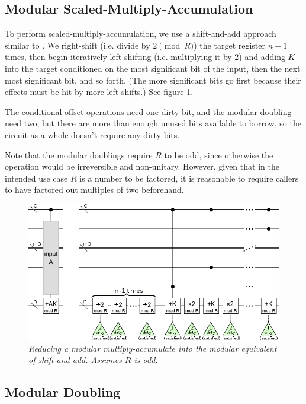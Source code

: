 \documentclass[twocolumn]{article}
\begin{document}
\subsection{Modular Scaled-Multiply-Accumulation}

To perform scaled-multiply-accumulation, we use a shift-and-add approach similar to \cite{beauregard2003}.
We right-shift (i.e. divide by $2 {\pmod R}$) the target register $n-1$ times, then begin iteratively left-shifting (i.e. multiplying it by 2) and adding $K$ into the target conditioned on the most significant bit of the input, then the next most significant bit, and so forth.
(The more significant bits go first because their effects must be hit by more left-shifts.)
See figure \ref{fig:controlled-modular-multiply-accumulate}.

The conditional offset operations need one dirty bit, and the modular doubling need two, but there are more than enough unused bits available to borrow, so the circuit as a whole doesn't require any dirty bits.

Note that the modular doublings require $R$ to be odd, since otherwise the operation would be irreversible and non-unitary.
However, given that in the intended use case $R$ is a number to be factored, it is reasonable to require callers to have factored out multiples of two beforehand.

\begin{figure}
  \centering
  \includegraphics[width=\linewidth]{assets/controlled-modular-multiply-accumulate.png}
  \caption{\em
    Reducing a modular multiply-accumulate into the modular equivalent of shift-and-add.
    Assumes $R$ is odd.
  }
  \label{fig:controlled-modular-multiply-accumulate}
\end{figure}


\subsection{Modular Doubling}
\end{document}
